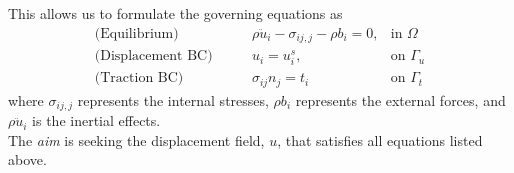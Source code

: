 \documentclass[12pt, a4paper]{article}
\numberwithin{equation}{section}
\begin{document}
This allows us to formulate the governing equations as
\begin{align}
    \text{(Equilibrium)} \quad \quad & \rho \ddot{u}_i - \sigma_{ij, j} - \rho b_i = 0, & \text{in $\Omega$} \\
    \text{(Displacement BC)} \quad \quad & u_i = u_i^s , & \text{on $\Gamma_u$} \\
    \text{(Traction BC)} \quad \quad & \sigma_{ij} n_j = t_i & \text{on $\Gamma_t$}
\end{align}
where $\sigma_{ij, j}$ represents the internal stresses, $\rho b_i$ represents the external forces, and $\rho \ddot{u}_i$ is the inertial effects. \\ 

The \textit{aim} is seeking the displacement field, $u$, that satisfies all equations listed above.
\end{document}
